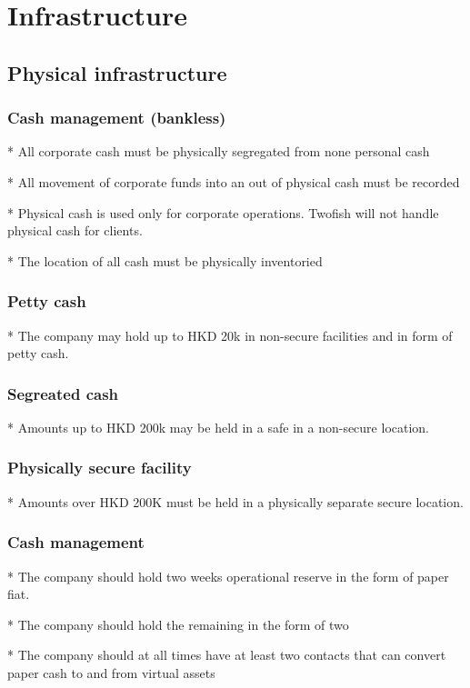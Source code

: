\chapter{Infrastructure}

\section{Physical infrastructure}



\subsection{Cash management (bankless)}

* All corporate cash must be physically segregated from none personal
cash

* All movement of corporate funds into an out of physical cash must be
recorded

* Physical cash is used only for corporate operations.  Twofish will
not handle physical cash for clients.

* The location of all cash must be physically inventoried

\subsection{Petty cash}
* The company may hold up to HKD 20k in non-secure facilities and in
form of petty cash.

\subsection{Segreated cash}
* Amounts up to HKD 200k may be held in a safe in a non-secure
location.  

\subsection{Physically secure facility}
* Amounts over HKD 200K must be held in a physically separate secure
location.

\subsection{Cash management}
* The company should hold two weeks operational reserve in the form of
paper fiat.

* The company should hold the remaining in the form of two

* The company should at all times have at least two contacts that can
convert paper cash to and from virtual assets

